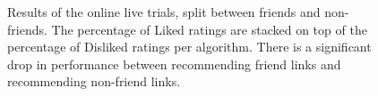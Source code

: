 \begin{figure}[h!]
\centering
{}
\caption{Results of the online live trials, split between friends and non-friends. The percentage of Liked ratings are stacked on top of the percentage of Disliked ratings per algorithm. There is a significant drop in performance between recommending friend links and recommending non-friend links.}
\label{fig:OnlineFriend1}
\end{figure}

